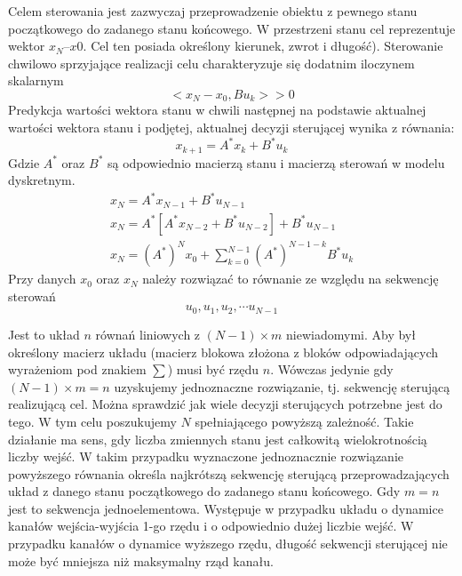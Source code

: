 \documentclass{article}
\begin{document}
			Celem sterowania jest zazwyczaj przeprowadzenie obiektu z pewnego stanu
			początkowego do zadanego stanu końcowego. W przestrzeni stanu cel reprezentuje
			wektor $x_N – x0$. Cel ten posiada określony kierunek, zwrot i długość).
			Sterowanie chwilowo
			sprzyjające realizacji celu charakteryzuje się dodatnim iloczynem skalarnym
			\begin{equation}
				<x_N-x_0, Bu_k> > 0
			\end{equation}
			Predykcja wartości wektora stanu w chwili następnej na podstawie aktualnej wartości
			wektora stanu i podjętej, aktualnej decyzji sterującej wynika z równania:
			\begin{equation}
				x_{k+1} = A^*x_k + B^*u_k
			\end{equation}
			Gdzie $A^*$ oraz $B^*$ są odpowiednio macierzą stanu i macierzą sterowań w modelu dyskretnym.
			\begin{align*}
				x_N = A^*x_{N-1} + B^*u_{N-1} \\
				x_N = A^*[A^*x_{N-2}+B^*u_{N-2}] + B^*u_{N-1} \\
				x_N = (A^*)^Nx_0+\sum^{N-1}_{k=0}(A^*)^{N-1-k}B^*u_k
			\end{align*}
			Przy danych $x_0$ oraz $x_N$ należy rozwiązać to równanie 
			ze względu na sekwencję sterowań
			\begin{equation}
				u_0,u_1,u_2,\cdots u_{N-1}
			\end{equation}

			Jest to układ $n$ równań liniowych z $(N-1) \times m$ niewiadomymi.
			Aby był określony macierz układu (macierz blokowa złożona z bloków odpowiadających
			wyrażeniom pod znakiem $\sum$) musi być rzędu $n$.
			Wówczas jedynie gdy $(N-1) \times m =n$
			uzyskujemy jednoznaczne rozwiązanie, tj. sekwencję sterującą realizującą cel.
			Można sprawdzić jak wiele decyzji sterujących potrzebne jest do tego. W tym celu
			poszukujemy $N$ spełniającego powyższą zależność. Takie działanie ma sens, gdy liczba
			zmiennych stanu jest całkowitą wielokrotnością liczby wejść.
			W takim przypadku wyznaczone jednoznacznie rozwiązanie powyższego
			równania określa najkrótszą sekwencję sterującą
			przeprowadzających układ z danego stanu początkowego do
			zadanego stanu końcowego.
			Gdy $m=n$ jest to sekwencja jednoelementowa. Występuje w przypadku
			układu o dynamice kanałów
			wejścia-wyjścia 1-go rzędu i o odpowiednio dużej liczbie wejść. W przypadku kanałów o
			dynamice wyższego rzędu, długość sekwencji sterującej nie może być mniejsza niż
			maksymalny rząd kanału.
\end{document}
